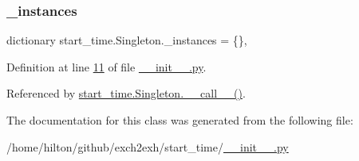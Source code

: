 \subsubsection{\texorpdfstring{\+\_\+instances}{\_instances}}
{\footnotesize\ttfamily dictionary start\+\_\+time.\+Singleton.\+\_\+instances = \{\}\hspace{0.3cm}{\ttfamily [static]}, {\ttfamily [private]}}



Definition at line \hyperlink{start__time_2____init_____8py_source_l00011}{11} of file \hyperlink{start__time_2____init_____8py_source}{\+\_\+\+\_\+init\+\_\+\+\_\+.\+py}.



Referenced by \hyperlink{start__time_2____init_____8py_source_l00012}{start\+\_\+time.\+Singleton.\+\_\+\+\_\+call\+\_\+\+\_\+()}.



The documentation for this class was generated from the following file\+:\begin{DoxyCompactItemize}
\item 
/home/hilton/github/exch2exh/start\+\_\+time/\hyperlink{start__time_2____init_____8py}{\+\_\+\+\_\+init\+\_\+\+\_\+.\+py}\end{DoxyCompactItemize}
